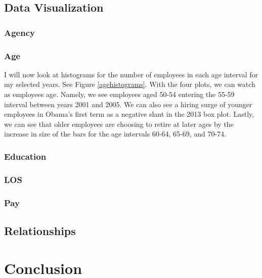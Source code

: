 \documentclass{article}
\begin{document}
    \subsection{Data Visualization}

        \subsubsection{Agency}

        \subsubsection{Age}
        I will now look at histograms for the number of employees in each age interval for my selected years. See Figure \ref{agehistograms}. With the four plots, we can watch as employees age. Namely, we see employees aged 50-54 entering the 55-59 interval between years 2001 and 2005. We can also see a hiring surge of younger employees in Obama's first term as a negative slant in the 2013 box plot. Lastly, we can see that older employees are choosing to retire at later ages by the increase in size of the bars for the age intervals 60-64, 65-69, and 70-74.

        \subsubsection{Education}

        \subsubsection{LOS}

        \subsubsection{Pay}

    \subsection{Relationships}

\section{Conclusion}

\newpage
\end{document}
